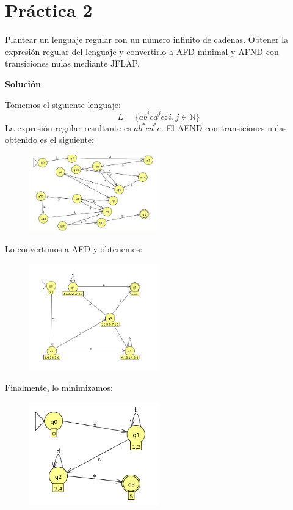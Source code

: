 \documentclass[12pt,spanish]{article}
\newenvironment{solution}{
	\par
	\textbf{Solución}
	\par

}
{
}
\begin{document}
\section{Práctica 2}
Plantear un lenguaje regular con un número infinito de cadenas. Obtener la expresión regular del lenguaje y convertirlo a AFD minimal y AFND con transiciones nulas mediante JFLAP.
\begin{solution}

Tomemos el siguiente lenguaje:
\[
		L = \{ ab^icd^je : i,j \in \mathbb{N}\}
\]
La expresión regular resultante es $ab^*cd^*e$. El AFND con transiciones nulas obtenido es el siguiente:
\begin{figure}[H]
	\centering
	\includegraphics[width=0.5\textwidth]{p2-1.jpg}
\end{figure}

Lo convertimos a AFD y obtenemos:
\begin{figure}[H]
	\centering
	\includegraphics[width=0.5\textwidth]{p2-2.png}
\end{figure}

Finalmente, lo minimizamos:
\begin{figure}[H]
	\centering
	\includegraphics[width=0.5\textwidth]{p2-3.png}
\end{figure}
\end{solution}
\end{document}
